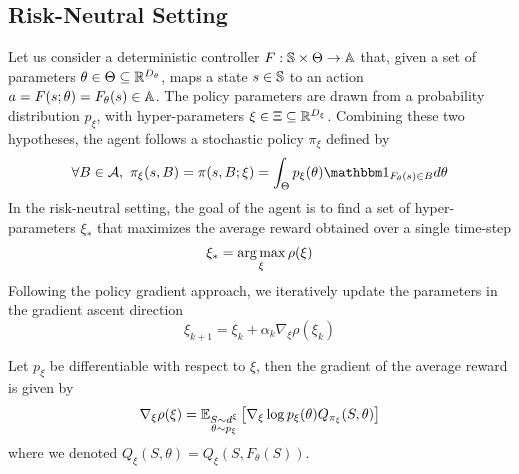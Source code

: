 \subsection{Risk-Neutral Setting}
Let us consider a deterministic controller $F: \S \times
\Theta \to \A$ that, given a set of parameters $\theta \in \Theta \subseteq
\R^{D_\theta}$, maps a state $s \in \S$ to an action $a = F(s; \theta) =
F_\theta(s) \in \A$. The policy parameters are drawn from a probability distribution $p_\xi$, with hyper-parameters $\xi \in \Xi \subseteq \R^{D_\xi}$. Combining these two
hypotheses, the agent follows a stochastic policy $\pi_\xi$ defined by
\begin{equation}
	\forall B \in \calA ,\ \pi_\xi(s,B) = \pi(s, B; \xi) = \int_\Theta p_\xi(\theta) 
	\ind{F_{\theta}(s)\in B} d\theta
\end{equation}
In the risk-neutral setting, the goal of the agent is to find a set of hyper-parameters $\xi_*$ that maximizes the average reward obtained over a single time-step 
\begin{equation*}
	\xi_* = \argmax_\xi \rho(\xi)
\end{equation*}
Following the policy gradient approach, we iteratively update the parameters in the gradient ascent direction 
\begin{equation*}
	\xi_{k+1} = \xi_k + \alpha_k \nabla_\xi \rho(\xi_k)
\end{equation*}
\begin{theorem}
	Let $p_\xi$ be differentiable with respect to $\xi$, then the gradient of the average reward is given by
	\begin{equation}
		\nabla_\xi \rho(\xi) = \E[\substack{S \sim d^\xi\\\theta \sim p_\xi}]{\nabla_\xi \log p_\xi(\theta) Q_{\pi_\xi}(S, \theta)}
	\end{equation}
	where we denoted $Q_\xi(S, \theta) = Q_\xi(S, F_\theta(S))$.
\end{theorem}
